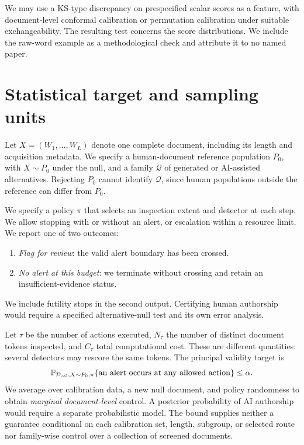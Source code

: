 \documentclass[pdflatex,sn-mathphys-num]{sn-jnl}
\newcommand{\Prob}{\mathbb{P}}
\newcommand{\calD}{\mathcal{D}}
\begin{document}
We may use a KS-type discrepancy on prespecified scalar scores as a feature, with document-level conformal calibration or permutation calibration under suitable exchangeability. The resulting test concerns the score distributions. We include the raw-word example as a methodological check and attribute it to no named paper.

\section{Statistical target and sampling units}\label{sec:setup}

Let \(X=(W_1,\ldots,W_L)\) denote one complete document, including its length and acquisition metadata. We specify a human-document reference population \(P_0\), with \(X\sim P_0\) under the null, and a family \(\mathcal Q\) of generated or AI-assisted alternatives. Rejecting \(P_0\) cannot identify \(\mathcal Q\), since human populations outside the reference can differ from \(P_0\).

We specify a policy \(\pi\) that selects an inspection extent and detector at each step. We allow stopping with or without an alert, or escalation within a resource limit. We report one of two outcomes:
\begin{enumerate}
\item \emph{Flag for review}: the valid alert boundary has been crossed.
\item \emph{No alert at this budget}: we terminate without crossing and retain an insufficient-evidence status.
\end{enumerate}
We include futility stops in the second output. Certifying human authorship would require a specified alternative-null test and its own error analysis.

Let \(\tau\) be the number of actions executed, \(N_\tau\) the number of distinct document tokens inspected, and \(C_\tau\) total computational cost. These are different quantities: several detectors may rescore the same tokens. The principal validity target is
\begin{equation}
 \Prob_{\calD_{\rm cal},X\sim P_0,\pi}
 \{\text{an alert occurs at any allowed action}\}\leq\alpha.
 \label{eq:target}
\end{equation}
We average over calibration data, a new null document, and policy randomness to obtain \emph{marginal document-level} control. A posterior probability of AI authorship would require a separate probabilistic model. The bound supplies neither a guarantee conditional on each calibration set, length, subgroup, or selected route nor family-wise control over a collection of screened documents.
\end{document}

